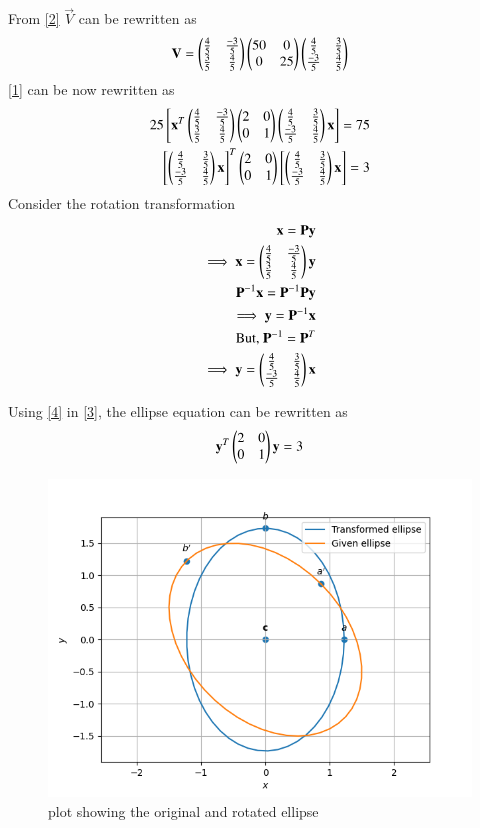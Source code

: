 \documentclass[journal,12pt,twocolumn]{IEEEtran}
\begin{document}
From \eqref{2} $\vec{V}$ can be rewritten as
\begin{align}
    \mathbf{V}=\begin{pmatrix}\frac{4}{5}&\frac{-3}{5}\\ \frac{3}{5}&\frac{4}{5}\end{pmatrix}\begin{pmatrix}50&0\\0&25\end{pmatrix}\begin{pmatrix}\frac{4}{5}&\frac{3}{5}\\ \frac{-3}{5}&\frac{4}{5}\end{pmatrix}
\end{align}
\eqref{1} can be now rewritten as
\begin{align}
25\left[\mathbf{x}^T\begin{pmatrix}\frac{4}{5}&\frac{-3}{5}\\ \frac{3}{5}&\frac{4}{5}\end{pmatrix}\begin{pmatrix}2&0\\0&1\end{pmatrix}\begin{pmatrix}\frac{4}{5}&\frac{3}{5}\\ \frac{-3}{5}&\frac{4}{5}\end{pmatrix}\mathbf{x}\right]=75\\
  \left[\begin{pmatrix}\frac{4}{5}&\frac{3}{5}\\ \frac{-3}{5}&\frac{4}{5}\end{pmatrix}\mathbf{x}\right]^T\begin{pmatrix}2&0\\0&1\end{pmatrix}\left[\begin{pmatrix}\frac{4}{5}&\frac{3}{5}\\ \frac{-3}{5}&\frac{4}{5}\end{pmatrix}\mathbf{x}\right]= 3\label{3}
\end{align}
 Consider the rotation transformation 
\begin{align}
  \mathbf{x}=\mathbf{P}\mathbf{y}\\
  \implies \mathbf{x}=\begin{pmatrix}\frac{4}{5}&\frac{-3}{5}\\ \frac{3}{5}&\frac{4}{5}\end{pmatrix}\mathbf{y}\label{4}\\
  \mathbf{P}^{-1}\mathbf{x}=\mathbf{P}^{-1}\mathbf{P}\mathbf{y}\\
  \implies \mathbf{y}= \mathbf{P}^{-1}\mathbf{x}\\
  \text{But, }\mathbf{P}^{-1}=\mathbf{P}^T\\
  \implies \mathbf{y}=\begin{pmatrix}\frac{4}{5}&\frac{3}{5}\\ \frac{-3}{5}&\frac{4}{5}\end{pmatrix}\mathbf{x}
\end{align}

Using \eqref{4} in \eqref{3}, the ellipse equation can be rewritten as
\begin{align}
     \mathbf{y}^T\begin{pmatrix}2&0\\0&1\end{pmatrix}\mathbf{y}=3
\end{align}
\begin{figure}[!ht]
\centering
\includegraphics[width=\columnwidth]{plot.png}
\caption{plot showing the original and rotated ellipse}
\label{Fig}
\end{figure}
\end{document}
